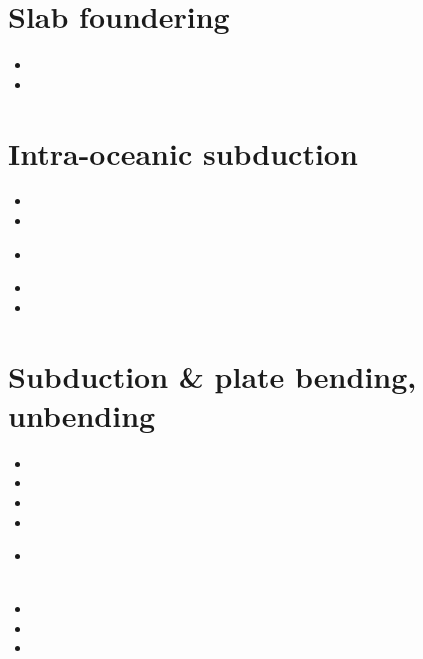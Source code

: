 \section{Slab foundering}

\begin{small}
\begin{itemize}
\item[\twothousand]
\item[\twothousandtwentythree]
\end{itemize}
\end{small}

\section{Intra-oceanic subduction}

\begin{small}
\begin{itemize}
\item[\twothousandeleven]
\item[\twothousandthirteen]
\item[\twothousandfifteen]
 \\
\item[\twothousandnineteen]
\item[\twothousandtwentytwo]
\end{itemize}
\end{small}

\section{Subduction \& plate bending, unbending}

\begin{small}
\begin{itemize}
\item[\nineteenninetynine]
\item[\twothousandsix]
\item[\twothousandeight]
\item[\twothousandnine]
\item[\twothousandtwelve]
 \\
 \\
\item[\twothousandfourteen]
\item[\twothousandnineteen]
\item[\twothousandtwentyone]
\end{itemize}
\end{small}

